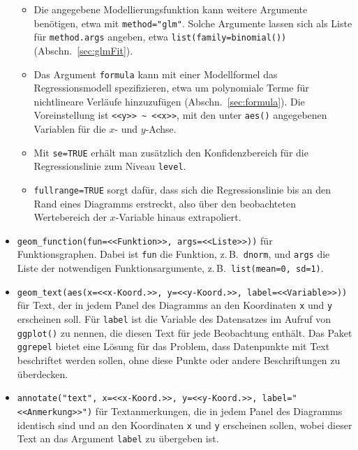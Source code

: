 \begin{itemize}
\begin{itemize}
\item Die angegebene Modellierungsfunktion kann weitere Argumente benötigen, etwa mit \lstinline!method="glm"!. Solche Argumente lassen sich als Liste für \lstinline!method.args! angeben, etwa \lstinline!list(family=binomial())! (Abschn.\ \ref{sec:glmFit}).
\item Das Argument \lstinline!formula! kann mit einer Modellformel das Regressionsmodell spezifizieren, etwa um polynomiale Terme für nichtlineare Verläufe hinzuzufügen (Abschn.\ \ref{sec:formula}). Die Voreinstellung ist \lstinline!<<y>> ~ <<x>>!, mit den unter \lstinline!aes()! angegebenen Variablen für die $x$- und $y$-Achse.
\item Mit \lstinline!se=TRUE! erhält man zusätzlich den Konfidenzbereich für die Regressionslinie zum Niveau \lstinline!level!.
\item \lstinline!fullrange=TRUE! sorgt dafür, dass sich die Regressionslinie bis an den Rand eines Diagramms erstreckt, also über den beobachteten Wertebereich der $x$-Variable hinaus extrapoliert.
\end{itemize}
\item {} \lstinline!geom_function(fun=<<Funktion>>, args=<<Liste>>))! für Funktionsgraphen. Dabei ist \lstinline!fun! die Funktion, z.\,B.\ \lstinline!dnorm!, und \lstinline!args! die Liste der notwendigen Funktionsargumente, z.\,B.\ \lstinline!list(mean=0, sd=1)!.
\item {} \lstinline!geom_text(aes(x=<<x-Koord.>>, y=<<y-Koord.>>, label=<<Variable>>))! für Text, der in jedem Panel des Diagramms an den Koordinaten \lstinline!x! und \lstinline!y! erscheinen soll. Für \lstinline!label! ist die Variable des Datensatzes im Aufruf von \lstinline!ggplot()! zu nennen, die diesen Text für jede Beobachtung enthält. Das Paket \lstinline!ggrepel! \cite{Slowikowski2024} bietet eine Lösung für das Problem, dass Datenpunkte mit Text beschriftet werden sollen, ohne diese Punkte oder andere Beschriftungen zu überdecken.
\item {} \lstinline!annotate("text", x=<<x-Koord.>>, y=<<y-Koord.>>, label="<<Anmerkung>>")! für Textanmerkungen, die in jedem Panel des Diagramms identisch sind und an den Koordinaten \lstinline!x! und \lstinline!y! erscheinen sollen, wobei dieser Text an das Argument \lstinline!label! zu übergeben ist.
\end{itemize}


